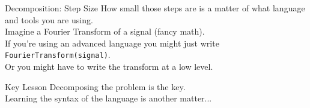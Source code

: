 \documentclass[aspectratio=169]{beamer}
\begin{document}
\begin{frame}{Decomposition: Step Size}
\large
How small those steps are is a matter of what language and tools you are using. \\
\vspace{1em}
Imagine a Fourier Transform of a signal (fancy math).  \\
\vspace{1em}
If you're using an advanced language you might just write \texttt{FourierTransform(signal)}. \\
\vspace{1em}
Or you might have to write the transform at a low level.
\end{frame}

\begin{frame}{Key Lesson}
\Large
Decomposing the problem is the key.\\
\vspace{1em}
Learning the syntax of the language is another matter...
\end{frame}
\end{document}
